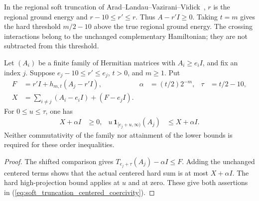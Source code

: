 In the regional soft truncation of
Arad--Landau--Vazirani--Vidick~\cite[lines 1178--1185]{Arad2016RigorousRG},
$r$ is the regional ground energy and $r-10\leq r'\leq r$. Thus
$A-r'I\geq0$. Taking $t=m$ gives the hard threshold $m/2-10$ above the true
regional ground energy. The crossing interactions belong to the unchanged
complementary Hamiltonian; they are not subtracted from this threshold.

\begin{lemma}
    \label{thm:soft_truncation_centered_coercivity}
    \leanok
    Let $(A_i)$ be a finite family of Hermitian matrices with $A_i\ge e_iI$,
    and fix an index $j$. Suppose $e_j-10\le r'\le e_j$, $t>0$, and $m\ge1$.
    Put
    \begin{align*}
        F      & =r'I+h_{m,t}(A_j-r'I),             &
        \alpha & =(t/2)2^{-m},                      & \tau & =t/2-10, \\
        X      & =\sum_{i\ne j}(A_i-e_iI)+(F-e_jI).
    \end{align*}
    For $0\le u\le\tau$, one has
    \begin{align}
        X+\alpha I                        & \ge0,           &
        u\,\mathbf1_{[e_j+u,\infty)}(A_j) & \le X+\alpha I.
        \label{eq:soft_truncation_centered_coercivity}
    \end{align}
    Neither commutativity of the family nor attainment of the lower bounds
    is required for these order inequalities.
\end{lemma}
\begin{proof}\leanok
    The shifted comparison gives $T_{e_j+\tau}(A_j)-\alpha I\le F$.
    Adding the unchanged centered terms shows that the actual centered hard
    sum is at most $X+\alpha I$. The hard high-projection bound applies at
    $u$ and at zero. These give both assertions in
    (\ref{eq:soft_truncation_centered_coercivity}).
\end{proof}

